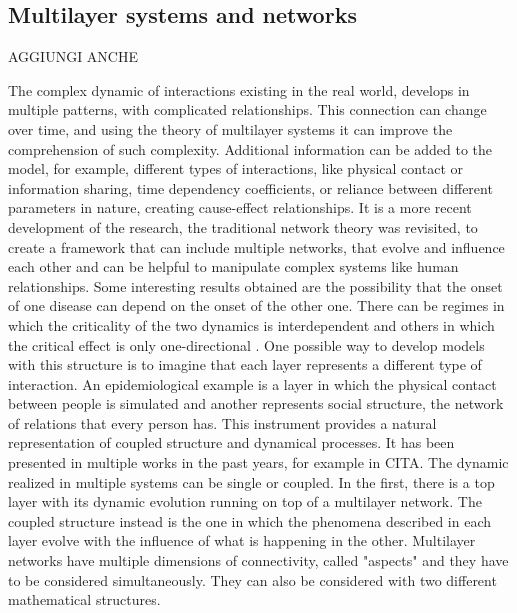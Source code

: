 \subsection{Multilayer systems and networks} 

AGGIUNGI ANCHE \cite{Wang_2019}

The complex dynamic of interactions existing in the real world, develops in multiple patterns, with complicated relationships. This connection can change over time, and using the theory of multilayer systems it can improve the comprehension of such complexity. Additional information can be added to the model, for example, different types of interactions, like physical contact or information sharing, time dependency coefficients, or reliance between different parameters in nature, creating cause-effect relationships. 
It is a more recent development of the research, the traditional network theory was revisited, to create a framework that can include multiple networks, that evolve and influence each other \cite{DeDomenico2016} and can be helpful to manipulate complex systems like human relationships. Some interesting results obtained are the possibility that the onset of one disease can depend on the onset of the other one. There can be regimes in which the criticality of the two dynamics is interdependent and others in which the critical effect is only one-directional \cite{DeDomenico2016}. 
One possible way to develop models with this structure is to imagine that each layer represents a different type of interaction. An epidemiological example is a layer in which the physical contact between people is simulated and another represents social structure, the network of relations that every person has. This instrument provides a natural representation of coupled structure and dynamical processes. It has been presented in multiple works in the past years, for example in CITA. 
The dynamic realized in multiple systems can be single or coupled. In the first, there is a top layer with its dynamic evolution running on top of a multilayer network. The coupled structure instead is the one in which the phenomena described in each layer evolve with the influence of what is happening in the other. 
Multilayer networks have multiple dimensions of connectivity, called "aspects" and they have to be considered simultaneously. 
They can also be considered with two different mathematical structures. 
